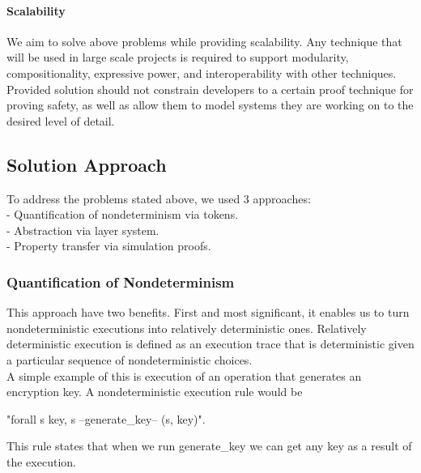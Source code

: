 \documentclass[onecolumn]{paper}
\begin{document}
\paragraph{Scalability}
We aim to solve above problems while providing scalability. Any technique that will be used in large scale projects is required to support modularity, compositionality, expressive power, and interoperability with other techniques. Provided solution should not constrain developers to a certain proof technique for proving safety, as well as allow them to model systems they are working on to the desired level of detail. 


\subsection*{Solution Approach}
To address the problems stated above, we used 3 approaches:\\
- Quantification of nondeterminism via tokens.\\
- Abstraction via layer system.\\
- Property transfer via simulation proofs.


\subsubsection*{Quantification of Nondeterminism}


This approach have two benefits. First and most significant, it enables us to
turn nondeterministic executions into relatively deterministic ones. 
Relatively deterministic execution is defined as an execution trace that is 
deterministic given a particular sequence of nondeterministic choices.\\

A simple example of this is execution of an operation that generates an encryption key. 
A nondeterministic execution rule would be

"forall s key, s --generate\_key-- (s, key)". 

This rule states that when we run generate\_key we can get any key as a result of the execution.
\end{document}
